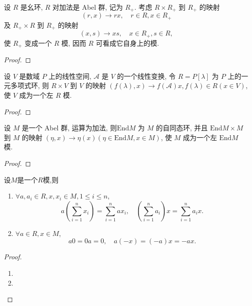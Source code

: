 \documentclass[../../main.tex]{subfiles}%
\begin{document}
\begin{example}
设 \( R \) 是幺环, \( R \) 对加法是 Abel 群, 记为 \( R_+ \). 考虑 \( R \times R_+ \) 到 \( R_+ \) 的映射
\[
(r,x) \to rx, \quad r \in R, x \in R_+
\]
及 \( R_+ \times R \) 到 \( R_+ \) 的映射
\[
(x,s) \to xs, \quad x \in R_+, s \in R,
\]
使 \( R_+ \) 变成一个 \( R \) 模, 因而 \( R \) 可看成它自身上的模.
\end{example}
\begin{proof}



\end{proof}

\begin{example}\label{example:抽象代数-例题1.6.4}
设 \( V \) 是数域 \( P \) 上的线性空间, \( \mathcal{A} \) 是 \( V \) 的一个线性变换, 令 \( R = P[\lambda] \) 为 \( P \) 上的一元多项式环, 则 \( R \times V \) 到 \( V \) 的映射 \( (f(\lambda),x) \to f(\mathcal{A})x, f(\lambda) \in R (x \in V) \), 使 \( V \) 成为一个左 \( R \) 模.
\end{example}
\begin{proof}



\end{proof}

\begin{example}
设 \( M \) 是一个 Abel 群, 运算为加法, 则\( \text{End}M \) 为 \( M \) 的自同态环, 并且 \( \text{End}M \times M \) 到 \( M \) 的映射 \( (\eta,x) \to \eta(x) (\eta \in \text{End}M, x \in M) \), 使 \( M \) 成为一个左 \( \text{End}M \) 模.
\end{example}
\begin{proof}



\end{proof}

\begin{theorem}
设$M$是一个$R$模,则
\begin{enumerate}[(1)]
\item  \( \forall a,a_i \in R, x,x_i \in M, 1 \leqslant i \leqslant n \),
\[
a\left( \sum_{i=1}^n x_i \right) = \sum_{i=1}^n ax_i, \quad \left( \sum_{i=1}^n a_i \right) x = \sum_{i=1}^n a_i x.
\]

\item \( \forall a \in R, x \in M \),
\[
a0 = 0a = 0, \quad a(-x) = (-a)x = -ax.
\]
\end{enumerate}
\end{theorem}
\begin{proof}
\begin{enumerate}[(1)]
\item 

\item 
\end{enumerate}

\end{proof}
\end{document}
